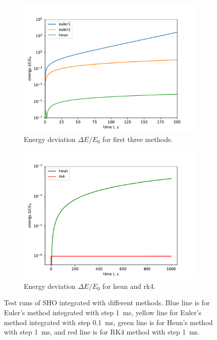 \documentclass[]{article}
\begin{document}
\begin{figure}[htb]
		\hfill
		\begin{subfigure}[t]{0.48\textwidth}
			\centering
			\includegraphics[width=\textwidth]{figures/eul12+heun+energy.pdf}
			\caption{Energy deviation $\Delta E/E_0$ for first three methods.\label{subfig:sho-energy1}}
		\end{subfigure}
		\hfill
		\begin{subfigure}[t]{0.48\textwidth}
			\centering
			\includegraphics[width=\textwidth]{figures/heunRK4+energy.pdf}
			\caption{Energy deviation $\Delta E/E_0$ for heun and rk4.\label{subfig:sho-energy2}}
		\end{subfigure}
		\hfill
		\caption{Test runs of SHO integrated with different methods. Blue line is for Euler's method integrated with step \SI{1}{ms}, yellow line for Euler's method integrated with step \SI{0.1}{ms}, green line is for Heun's method with step \SI{1}{ms}, and red line is for RK4 method with step \SI{1}{ms}.\label{fig:sho-integration}}
	\end{figure}
\end{document}
